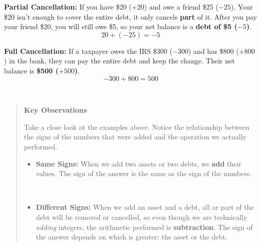 \documentclass{ximera}[font=12pt]
\begin{document}
\begin{example}
    \textbf{Partial Cancellation:} If you have \$20 ($+20$) and owe a friend \$25 ($-25$). Your \$20 isn't enough to 
    cover the entire debt, it only cancels \textbf{part} of it.  After you pay your friend \$20, you will still owe \$5, so
    your net balance is a \textbf{debt of \$5 ($-5$)}.
    \[ 20 + (-25) = -5 \]
\end{example}

\begin{example}
    \textbf{Full Cancellation:} If a taxpayer owes the IRS \$300 ($-300$) and has \$800 ($+800$) in the bank, they can pay the 
    entire debt and keep the change. Their net balance is \textbf{\$500 ($+500$)}.
    \[ -300 + 800 = 500 \]
\end{example}


\mbox{} \\[2pt]

\begin{quote}
\textbf{Key Observations}


Take a close look at the examples above. Notice the relationship between the signs of the numbers that were added and the operation we actually performed.

\begin{itemize}
    \item \textbf{Same Signs:} When we add two assets or two debts, we \textbf{add} their values.  The sign of the answer is the same as the sign of the numbers.

    ~ \\[0.2em]

    \item \textbf{Different Signs:} When we add an asset and a debt, all or part of the debt will be removed or cancelled, so even though we are technically \emph{adding} integers, the arithmetic performed is \textbf{subtraction}.  The sign of the answer depends on which is greater: the asset or the debt.
\end{itemize}


\end{quote}
\end{document}
